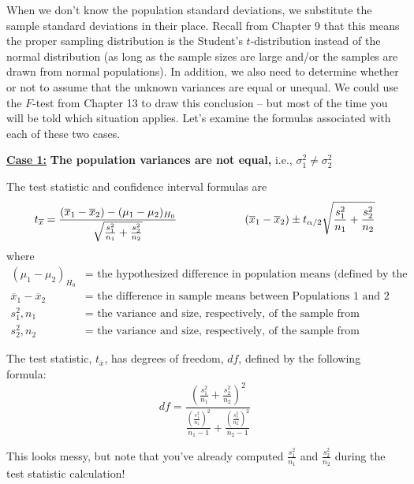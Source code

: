 \documentclass[12pt, letterpaper]{article}
\newcommand{\ds}{\displaystyle}
\theoremstyle{definition}
\begin{document}
\vfill

\newpage

\noindent When we don't know the population standard deviations, we substitute the sample standard deviations in their place.  Recall from Chapter 9 that this means the proper sampling distribution is the Student's $t$-distribution instead of the normal distribution (as long as the sample sizes are large and/or the samples are drawn from normal populations).  In addition, we also need to determine whether or not to assume that the unknown variances are equal or unequal.  We could use the $F$-test from Chapter 13 to draw this conclusion -- but most of the time you will be told which situation applies.  Let's examine the formulas associated with each of these two cases.

\begin{statement}

\textbf{\underline{Case 1:}}  \textbf{The population variances are not equal,} i.e., $\sigma_1^2\neq\sigma_2^2$

The test statistic and confidence interval formulas are
$$ t_{\overline{x}} = \frac{(\overline{x}_1-\overline{x}_2)-(\mu_1-\mu_2)_{H_0}}{\sqrt{\frac{s_1^2}{n_1}+\frac{s_2^2}{n_2}}}\hspace*{.85in}  (\overline{x}_1-\overline{x}_2)\pm t_{\alpha/2}\sqrt{\frac{s_1^2}{n_1}+\frac{s_2^2}{n_2}} $$
where
\vspace*{-.2in}
\begin{align*}
(\mu_1-\mu_2)_{H_0} &= \text{ the hypothesized difference in population means (defined by the null hypothesis)}\\
\overline{x}_1-\overline{x}_2 &= \text{ the difference in sample means between Populations 1 and 2}\\
s_1^2,n_1 &= \text{ the variance and size, respectively, of the sample from Population 1}\\
s_2^2,n_2 &= \text{ the variance and size, respectively, of the sample from Population 2}
\end{align*}

\vspace*{.1in}

The test statistic, $t_{\overline{x}}$, has degrees of freedom, $df$, defined by the following formula:
$$ df = \frac{\left(\frac{s_1^2}{n_1}+\frac{s_2^2}{n_2}\right)^2}{\frac{\left( \frac{s_1^2}{n_1} \right)^2}{n_1 -1}+\frac{\left( \frac{s_2^2}{n_2} \right)^2}{n_2 -1}} $$

This looks messy, but note that you've already computed $\ds \frac{s_1^2}{n_1}$ and $\ds\frac{s_2^2}{n_2}$ during the test statistic calculation!

\end{statement}
\end{document}
